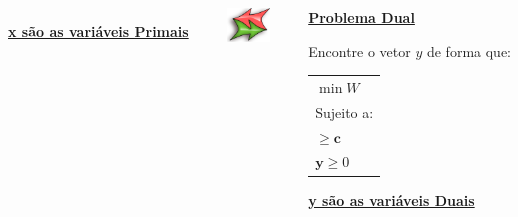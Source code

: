 \documentclass{beamer}
\begin{document}
\begin{frame}
\begin{columns}
\begin{column}{4cm}
\begin{mdframed}[backgroundcolor=blue!50]
\begin{table}
\begin{tabular}{l}
					\end{tabular}
				\end{table}
			\end{mdframed}
			\underline{\textbf{x são as variáveis Primais}}
		\end{column}
		\begin{column}{2cm}
			\includegraphics[width=2cm,height=0.9cm]{bi-directional_arrow.png}
		\end{column}
		\begin{column}{4cm}
			\underline{\textbf{Problema Dual}}
			\begin{mdframed}[backgroundcolor=red!50]
				Encontre o vetor \textbf{$y$} de forma que:
				\begin{table}
					\begin{tabular}{l}
						$ \min W $ \\
						Sujeito a: \\
						\color{green} $\ge \mathbf{c}$ \\
						$ \mathbf{y} \ge 0$ \\
					\end{tabular}
				\end{table}
			\end{mdframed}
			\underline{\textbf{y são as variáveis Duais}}
		\end{column}
	\end{columns}
	
\end{frame}
\end{document}
